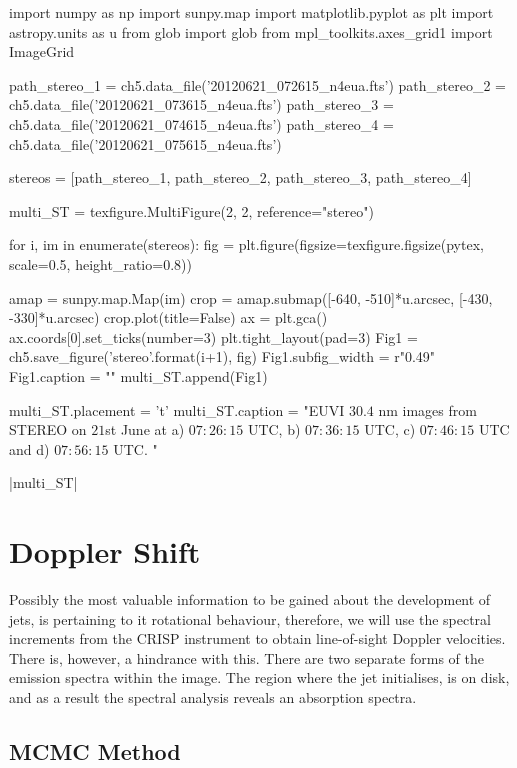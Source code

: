 \begin{pycode}[chapter5]
import numpy as np
import sunpy.map
import matplotlib.pyplot as plt
import astropy.units as u
from glob import glob
from mpl_toolkits.axes_grid1 import ImageGrid

path_stereo_1 = ch5.data_file('20120621_072615_n4eua.fts')
path_stereo_2 = ch5.data_file('20120621_073615_n4eua.fts')
path_stereo_3 = ch5.data_file('20120621_074615_n4eua.fts')
path_stereo_4 = ch5.data_file('20120621_075615_n4eua.fts')

stereos = [path_stereo_1, path_stereo_2, path_stereo_3, path_stereo_4]


multi_ST = texfigure.MultiFigure(2, 2, reference="stereo")


for i, im in enumerate(stereos):
	fig = plt.figure(figsize=texfigure.figsize(pytex, scale=0.5, height_ratio=0.8))
	
	amap = sunpy.map.Map(im)
	crop = amap.submap([-640, -510]*u.arcsec, [-430, -330]*u.arcsec)
	crop.plot(title=False)
	ax = plt.gca()
	ax.coords[0].set_ticks(number=3)
	plt.tight_layout(pad=3)
	Fig1 = ch5.save_figure('stereo{}'.format(i+1), fig)
	Fig1.subfig_width = r"0.49\textwidth"
	Fig1.caption = ""
	multi_ST.append(Fig1)

multi_ST.placement = 't'
multi_ST.caption = "EUVI $30.4$ nm images from STEREO on $21$st June at a) $07:26:15$ UTC, b) $07:36:15$ UTC, c) $07:46:15$  UTC and d) $07:56:15$ UTC. "
\end{pycode}

\py[chapter5]|multi_ST|



\section{Doppler Shift}
\label{sec:doppler-shift}

Possibly the most valuable information to be gained about the development of jets, is pertaining to it rotational behaviour, therefore, we will use the spectral increments from the CRISP instrument to obtain line-of-sight Doppler velocities.
There is, however, a hindrance with this.
There are two separate forms of the emission spectra within the image.
The region where the jet initialises, is on disk, and as a result the spectral analysis reveals an absorption spectra.

\subsection{MCMC Method}

